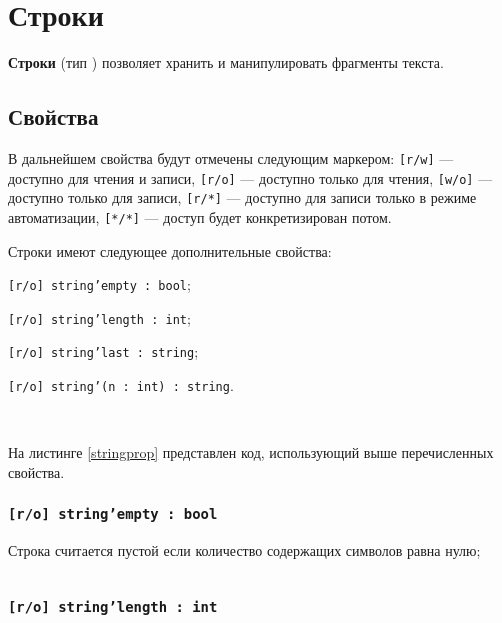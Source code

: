 \section{Строки}

{\bf Строки} (тип \str{}) позволяет хранить и манипулировать фрагменты текста. 

\subsection{Свойства}

В дальнейшем свойства будут отмечены следующим маркером: \texttt{[r/w]} — доступно для чтения и записи, \texttt{[r/o]} — доступно только для чтения, \texttt{[w/o]} — доступно только для записи,  \texttt{[r/*]} — доступно для записи только в режиме автоматизации, \texttt{[*/*]} — доступ будет конкретизирован потом.

Строки имеют следующее дополнительные свойства:
\begin{icItems}
\item
	\texttt{[r/o] string'empty : bool};
\item
	\texttt{[r/o] string'length : int};
\item
	\texttt{[r/o] string'last : string};
\item
    \texttt{[r/o] string'(n : int) : string}.
\end{icItems}

\

На листинге \ref{stringprop} представлен код, использующий выше перечисленных свойства.

\subsubsection{\texttt{[r/o] string'empty : bool}}

Строка считается пустой если количество содержащих символов равна нулю;

\begin{sourcecode}
    \label{stringprop}
    \inputminted[linenos]{icl}{../sources/stringprop.icL}
\end{sourcecode}

\subsubsection{\texttt{[r/o] string'length : int}}

